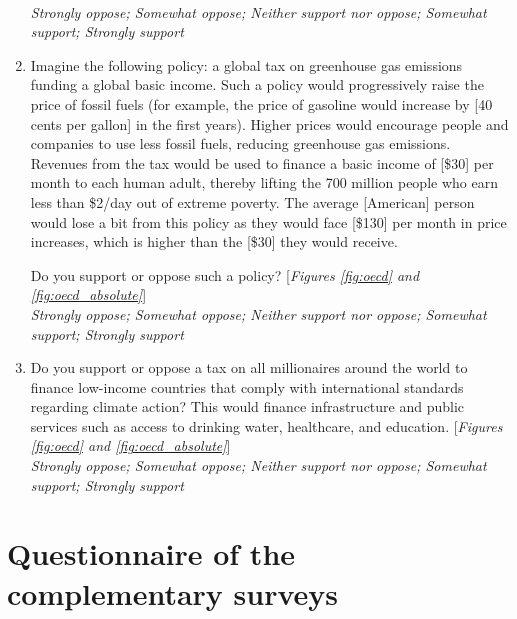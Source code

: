\begin{enumerate}
\\ \textit{Strongly oppose; Somewhat oppose; Neither support nor oppose; Somewhat support; Strongly support}
\item \label{q:global_tax_dividend} Imagine the following policy: a global tax on greenhouse gas emissions funding a global basic income. 
Such a policy would progressively raise the price of fossil fuels (for example, the price of gasoline would increase by [40 cents per gallon] in the first years). Higher prices would encourage people and companies to use less fossil fuels, reducing greenhouse gas emissions. Revenues from the tax would be used to finance a basic income of [\$30] per month to each human adult, thereby lifting the 700 million people who earn less than \$2/day out of extreme poverty. 
The average [American] person would lose a bit from this policy as they would face [\$130] per month in price increases, which is higher than the [\$30] they would receive.

Do you support or oppose such a policy?  [\textit{Figures \ref{fig:oecd} and \ref{fig:oecd_absolute}}]
\\ \textit{Strongly oppose; Somewhat oppose; Neither support nor oppose; Somewhat support; Strongly support}
\item \label{q:millionaire_tax} Do you support or oppose a tax on all millionaires around the world to finance low-income countries that comply with international standards regarding climate action? 
This would finance infrastructure and public services such as access to drinking water, healthcare, and education. [\textit{Figures \ref{fig:oecd} and \ref{fig:oecd_absolute}}]
\\ \textit{Strongly oppose; Somewhat oppose; Neither support nor oppose; Somewhat support; Strongly support}
\end{enumerate}



\renewcommand{\theenumi}{\arabic{enumi}}
\clearpage
\section{Questionnaire of the complementary surveys}\label{app:questionnaire}



